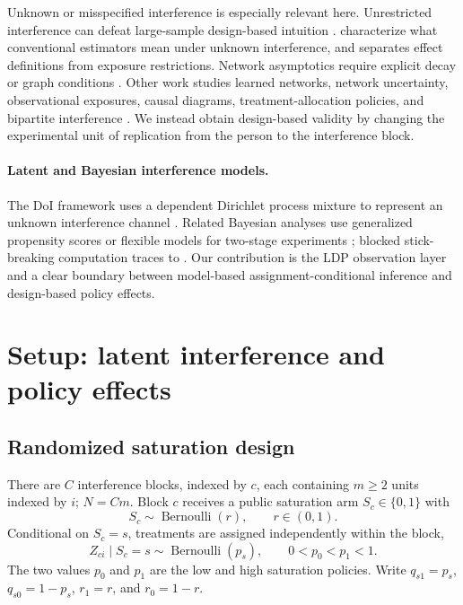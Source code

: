 \documentclass[10pt]{article}
\theoremstyle{definition}
\theoremstyle{remark}
\DeclareMathOperator{\Bern}{Bernoulli}
\begin{document}
Unknown or misspecified interference is especially relevant here. Unrestricted interference
can defeat large-sample design-based intuition \citep{BasseAiroldi2018}.
\citet{SavjeAronowHudgens2021} characterize what conventional estimators mean under unknown
interference, and \citet{Savje2024} separates effect definitions from exposure restrictions.
Network asymptotics require explicit decay or graph conditions
\citep{Leung2020,Leung2022,LiWager2022}. Other work studies learned networks, network
uncertainty, observational exposures, causal diagrams, treatment-allocation policies, and
bipartite interference
\citep{BhattacharyaMalinskyShpitser2020,ForastiereAiroldiMealli2021,
OgburnVanderWeele2014,PapadogeorgouMealliZigler2019,ZiglerPapadogeorgou2021,
HarshawEtAl2023}. We instead obtain design-based validity by changing the experimental unit of
replication from the person to the interference block.

\paragraph{Latent and Bayesian interference models.}
The DoI framework uses a dependent Dirichlet process mixture to represent an unknown
interference channel \citep{OhnishiKarmakarSabbaghi2025}. Related Bayesian analyses use
generalized propensity scores or flexible models for two-stage experiments
\citep{ForastiereEtAl2022,OhnishiSabbaghi2024}; blocked stick-breaking computation traces to
\citet{IshwaranJames2001}. Our contribution is the LDP observation layer and a clear boundary
between model-based assignment-conditional inference and design-based policy effects.

\section{Setup: latent interference and policy effects}
\label{sec:setup}

\subsection{Randomized saturation design}

There are $C$ interference blocks, indexed by $c$, each containing $m\ge2$ units indexed by $i$;
$N=Cm$. Block $c$ receives a public saturation arm $S_c\in\{0,1\}$ with
\[
  S_c\sim\Bern(r), \qquad r\in(0,1).
\]
Conditional on $S_c=s$, treatments are assigned independently within the block,
\[
  Z_{ci}\mid S_c=s\sim\Bern(p_s), \qquad 0<p_0<p_1<1.
\]
The two values $p_0$ and $p_1$ are the low and high saturation policies. Write
$q_{s1}=p_s$, $q_{s0}=1-p_s$, $r_1=r$, and $r_0=1-r$.
\end{document}
